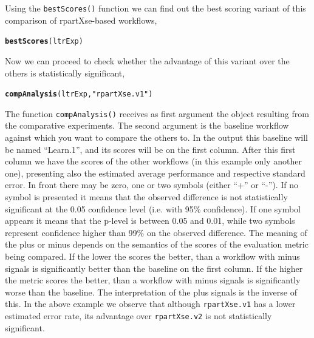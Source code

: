 \documentclass[10pt,a4paper]{article}\usepackage[]{graphicx}\usepackage[]{color}
\makeatletter
\newcommand{\hlstr}[1]{\textcolor[rgb]{0.192,0.494,0.8}{#1}}%
\newcommand{\hlstd}[1]{\textcolor[rgb]{0.345,0.345,0.345}{#1}}%
\newcommand{\hlkwd}[1]{\textcolor[rgb]{0.737,0.353,0.396}{\textbf{#1}}}%
\newenvironment{kframe}{%
 \def\at@end@of@kframe{}%
 \ifinner\ifhmode%
  \def\at@end@of@kframe{\end{minipage}}%
  \begin{minipage}{\columnwidth}%
 \fi\fi%
 \def\FrameCommand##1{\hskip\@totalleftmargin \hskip-\fboxsep
 \colorbox{shadecolor}{##1}\hskip-\fboxsep
     \hskip-\linewidth \hskip-\@totalleftmargin \hskip\columnwidth}%
 \MakeFramed {\advance\hsize-\width
   \@totalleftmargin\z@ \linewidth\hsize
   \@setminipage}}%
 {\par\unskip\endMakeFramed%
 \at@end@of@kframe}
\newenvironment{knitrout}{}{} %
\makeatother
\begin{document}
Using the \texttt{bestScores()} function we can find out the best
scoring variant of this comparison of rpartXse-based workflows,

\begin{knitrout}
\color{fgcolor}\begin{kframe}
\begin{alltt}
\hlkwd{bestScores}\hlstd{(ltrExp)}
\end{alltt}


{\ttfamily\noindent\bfseries{}}\end{kframe}
\end{knitrout}


Now we can proceed to check whether the advantage of this variant over
the others is statistically significant,

\begin{knitrout}
\color{fgcolor}\begin{kframe}
\begin{alltt}
\hlkwd{compAnalysis}\hlstd{(ltrExp,} \hlstr{"rpartXse.v1"}\hlstd{)}
\end{alltt}


{\ttfamily\noindent\bfseries{}}\end{kframe}
\end{knitrout}


The function \texttt{compAnalysis()} receives as first argument the
object resulting from the comparative experiments. The second argument
is the baseline workflow against which you want to compare the others
to. In the output this baseline will be named ``Learn.1'', and its
scores will be on the first column. After this first column we have
the scores of the other workflows (in this example only another one),
presenting also the estimated average performance and respective
standard error. In front there may be zero, one or two symbols (either
``+'' or ``-''). If no symbol is presented it means that the observed
difference is not statistically significant at the 0.05 confidence
level (i.e. with 95\% confidence). If one symbol appears it means that
the p-level is between 0.05 and 0.01, while two symbols represent
confidence higher than 99\% on the observed difference. The meaning of
the plus or minus depends on the semantics of the scores of the
evaluation metric being compared. If the lower the scores the better,
than a workflow with minus signals is significantly better than the
baseline on the first column. If the higher the metric scores the
better, than a workflow with minus signals is significantly worse than
the baseline. The interpretation of the plus signals is the inverse of
this. In the above example we observe that although
\texttt{rpartXse.v1} has a lower estimated error rate, its advantage
over \texttt{rpartXse.v2} is not statistically significant.
\end{document}
